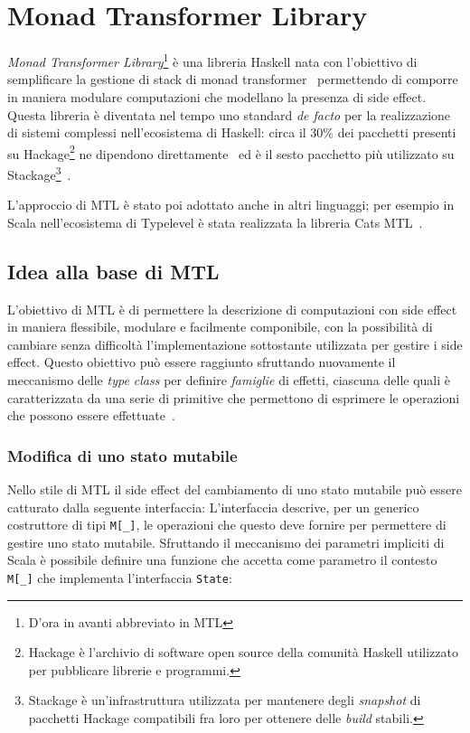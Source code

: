 \section{Monad Transformer Library}

\emph{Monad Transformer Library}\footnote{D'ora in avanti abbreviato in MTL} è una libreria Haskell nata con l'obiettivo di semplificare la gestione di stack di monad transformer~\cite{cit:mtl} permettendo di comporre in maniera modulare computazioni che modellano la presenza di side effect.
Questa libreria è diventata nel tempo uno standard \emph{de facto} per la realizzazione di sistemi complessi nell'ecosistema di Haskell: circa il 30\% dei pacchetti presenti su Hackage\footnote{Hackage è l'archivio di software open source della comunità Haskell utilizzato per pubblicare librerie e programmi.} ne dipendono direttamente~\cite{cit:which-monads-haskell-developers-use-an-exploratory-study} ed è il sesto pacchetto più utilizzato su Stackage\footnote{Stackage è un'infrastruttura utilizzata per mantenere degli \emph{snapshot} di pacchetti Hackage compatibili fra loro per ottenere delle \emph{build} stabili.}~\cite{cit:evolution-of-a-haskell-repository-and-its-use-of-monads-an-exploratory-study-of-stackage}.

L'approccio di MTL è stato poi adottato anche in altri linguaggi; per esempio in Scala nell'ecosistema di Typelevel è stata realizzata la libreria Cats MTL~\cite{cit:cats-mtl}.

\subsection{Idea alla base di MTL}
L'obiettivo di MTL è di permettere la descrizione di computazioni con side effect in maniera flessibile, modulare e facilmente componibile, con la possibilità di cambiare senza difficoltà l'implementazione sottostante utilizzata per gestire i side effect.
Questo obiettivo può essere raggiunto sfruttando nuovamente il meccanismo delle \emph{type class} per definire \emph{famiglie} di effetti, ciascuna delle quali è caratterizzata da una serie di primitive che permettono di esprimere le operazioni che possono essere effettuate~\cite{cit:functional-programming-with-overloading-and-higher-order-polymorphism}.

\subsubsection{Modifica di uno stato mutabile}
Nello stile di MTL il side effect del cambiamento di uno stato mutabile può essere catturato dalla seguente interfaccia:
L'interfaccia descrive, per un generico costruttore di tipi \lstinline{M[_]}, le operazioni che questo deve fornire per permettere di gestire uno stato mutabile.
Sfruttando il meccanismo dei parametri impliciti di Scala è possibile definire una funzione che accetta come parametro il contesto \lstinline{M[_]} che implementa l'interfaccia \lstinline{State}:

